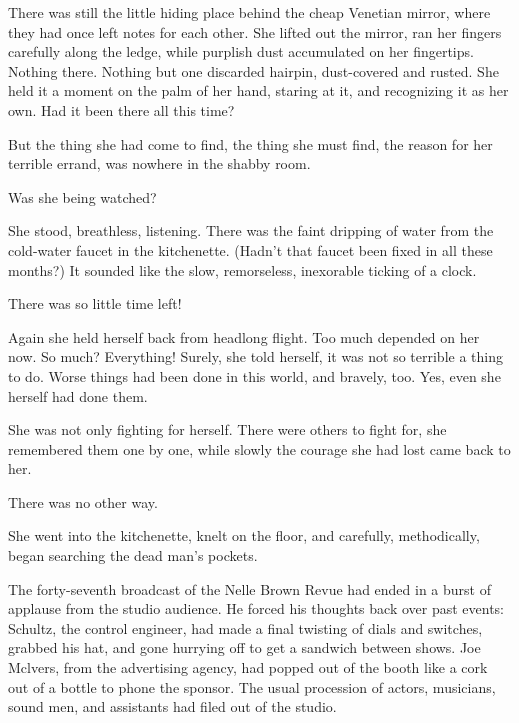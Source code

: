 \documentclass{novel}
\begin{document}
There was still the little hiding place behind the cheap Venetian mirror, where they had once left notes for each other. She lifted out the mirror, ran her fingers carefully along the ledge, while purplish dust accumulated on her fingertips. Nothing there. Nothing but one discarded hairpin, dust-covered and rusted. She held it a moment on the palm of her hand, staring at it, and recognizing it as her own. Had it been there all this time?

But the thing she had come to find, the thing she must find, the reason for her terrible errand, was nowhere in the shabby room.

Was she being watched?

She stood, breathless, listening. There was the faint dripping of water from the cold-water faucet in the kitchenette. (Hadn’t that faucet been fixed in all these months?) It sounded like the slow, remorseless, inexorable ticking of a clock.

There was so little time left!

Again she held herself back from headlong flight. Too much depended on her now. So much? Everything! Surely, she told herself, it was not so terrible a thing to do. Worse things had been done in this world, and bravely, too. Yes, even she herself had done them.

She was not only fighting for herself. There were others to fight for, she remembered them one by one, while slowly the courage she had lost came back to her.

There was no other way.

She went into the kitchenette, knelt on the floor, and carefully, methodically, began searching the dead man’s pockets.

\vspace{2\nbs}
\clearpage
\thispagestyle{empty}

\begin{ChapterStart}
\vspace{3\nbs}
\end{ChapterStart}

The forty-seventh broadcast of the Nelle Brown Revue had ended in a burst of applause from the studio audience. He forced his thoughts back over past events: Schultz, the control engineer, had made a final twisting of dials and switches, grabbed his hat, and gone hurrying off to get a sandwich between shows. Joe Mclvers, from the advertising agency, had popped out of the booth like a cork out of a bottle to phone the sponsor. The usual procession of actors, musicians, sound men, and assistants had filed out of the studio.
\end{document}

